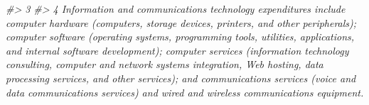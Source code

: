 \documentclass[
  xelatex, ja=standard]{bxjsbook}
\newenvironment{Shaded}{\begin{snugshade}}{\end{snugshade}}
\newcommand{\CommentTok}[1]{\textcolor[rgb]{0.56,0.35,0.01}{\textit{#1}}}
\theoremstyle{definition}
\theoremstyle{definition}
\theoremstyle{definition}
\theoremstyle{definition}
\theoremstyle{remark}
\begin{document}
\begin{Shaded}
\begin{Highlighting}[]
\CommentTok{\#\textgreater{} 3                                                                                                                                                                                                                                                                                                                                                                                                                                                                                                                                                                                                                                                                                                                                                                                                                                                                                                                                                                                                                                                                                                                                                                                                                                                                                                                                                                                                                                                   }
\CommentTok{\#\textgreater{} 4                                                                                                                                                                                                                                                                                                                                                                                                                                                                                                                                                                                                                                                                                                                                                                                                                                                                                            Information and communications technology expenditures include computer hardware (computers, storage devices, printers, and other peripherals); computer software (operating systems, programming tools, utilities, applications, and internal software development); computer services (information technology consulting, computer and network systems integration, Web hosting, data processing services, and other services); and communications services (voice and data communications services) and wired and wireless communications equipment.}

\end{Highlighting}
\end{Shaded}
\end{document}
